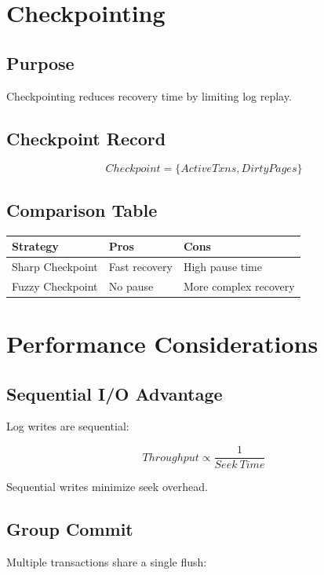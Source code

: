 \documentclass[12pt,a4paper]{report}
\begin{document}
\chapter{Checkpointing}

\section{Purpose}

Checkpointing reduces recovery time by limiting log replay.

\section{Checkpoint Record}

\[
Checkpoint = \{ActiveTxns, DirtyPages\}
\]

\section{Comparison Table}

\begin{longtable}{@{}lll@{}}
\toprule
Strategy & Pros & Cons \\
\midrule
Sharp Checkpoint & Fast recovery & High pause time \\
Fuzzy Checkpoint & No pause & More complex recovery \\
\bottomrule
\end{longtable}

\chapter{Performance Considerations}

\section{Sequential I/O Advantage}

Log writes are sequential:

\[
Throughput \propto \frac{1}{Seek\ Time}
\]

Sequential writes minimize seek overhead.

\section{Group Commit}

Multiple transactions share a single flush:
\end{document}
